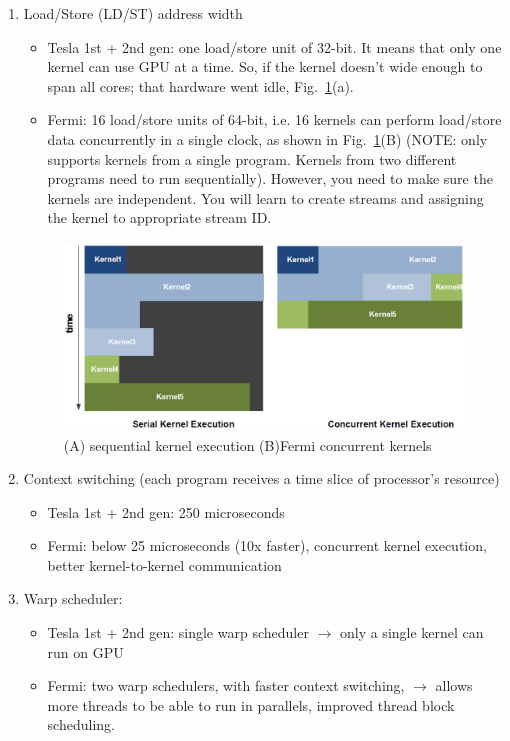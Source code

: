 \begin{enumerate}
\item Load/Store (LD/ST) address width
  \begin{itemize}
  \item Tesla 1st + 2nd gen: one load/store unit of 32-bit. It means
    that only one kernel can use GPU at a time. So, if the kernel
    doesn't wide enough to span all cores; that hardware went idle,
    Fig.~\ref{fig:fermi_kernel}(a). 

  \item Fermi: 16 load/store units of 64-bit, i.e. 16 kernels can
    perform load/store data concurrently in a single clock, as shown
    in Fig.~\ref{fig:fermi_kernel}(B) (NOTE: only supports kernels
    from a single program. Kernels from two different programs need to
    run sequentially). However, you need to make sure the kernels are
    independent.  You will learn to create streams and assigning the
    kernel to appropriate stream ID.

  \end{itemize}
  \begin{figure}[hbt]
    \centerline{\includegraphics[height=5cm,
      angle=0]{./images/fermi_concurrent_kernel.eps}}
    \caption{(A) sequential kernel execution (B)Fermi concurrent kernels}
    \label{fig:fermi_kernel}
  \end{figure}

\item Context switching (each program receives a time slice of
  processor's resource)
  \begin{itemize}
  \item Tesla 1st + 2nd gen: 250 microseconds
  \item Fermi: below 25 microseconds (10x faster), concurrent
    kernel execution, better kernel-to-kernel communication
  \end{itemize}

\item Warp scheduler:
  \begin{itemize}
  \item Tesla 1st + 2nd gen: single warp scheduler $\rightarrow$ only
    a single kernel can run on GPU

  \item Fermi: two warp schedulers, with faster context switching,
    $\rightarrow$ allows more threads to be able to run in parallels,
    improved thread block scheduling.
  \end{itemize}

\end{enumerate}

